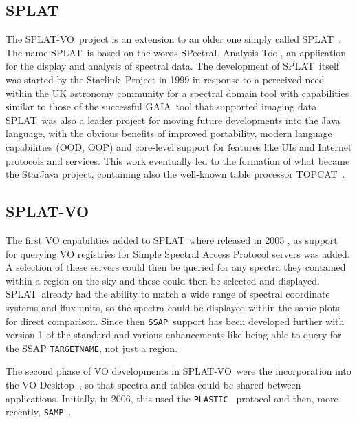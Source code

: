 \documentclass[final,authoryear,5p,times,twocolumn]{elsarticle}
\newcommand{\ssap}{\texttt{SSAP}}
\newcommand{\plastic}{\texttt{PLASTIC}}
\newcommand{\samp}{\texttt{SAMP}}
\newcommand{\splat}{\textsf{\small SPLAT}}
\newcommand{\splatvo}{{\textsf{\small{SPLAT-VO}}}}
\newcommand{\topcat}{\textsf{\small TOPCAT}}
\newcommand{\gaia}{\textsf{\small GAIA}}
\newcommand{\Starlink}{\textsf{\small Starlink}}
\newcommand{\vodesktop}{\textsf{\small VO-Desktop}}
\newcommand{\ascl}[1]{\href{http://www.ascl.net/#1}{ascl:#1}}
\begin{document}
\subsection{SPLAT}
%
The \splatvo\ project is an extension to an older one simply called
\splat\ \citep[][\ascl{1402.007}]{2002ASPC..281..513B}.  The name \splat\
is based on the words SPectraL Analysis Tool, an application for the
display and analysis of spectral data. The development of \splat\ itself
was started by the \Starlink\ Project \citep{1982QJRAS..23..485D} in
1999 in response to a perceived need within the UK astronomy community
for a spectral domain tool with capabilities similar to those of the
successful \gaia\ tool \citep[][\ascl{1403.024}]{2000ASPC..216..615D}
that supported imaging data. \splat\ was also a leader project for
moving future developments into the Java language, with the obvious
benefits of improved portability, modern language capabilities (OOD,
OOP) and core-level support for features like UIs and Internet
protocols and services. This work eventually led to the formation of
what became the StarJava project, containing also the well-known table processor \topcat\ \citep[][\ascl{1101.010}]{2005ASPC..347...29T}.

\subsection{SPLAT-VO}
%
The first VO capabilities added to \splat\ where released in 2005
\citep{2005ASPC..347...22D}, as support for querying VO registries for Simple
Spectral Access Protocol servers was added. A selection of these servers could
then be queried for any spectra they contained within a region on the sky and
these could then be selected and displayed. \splat\ already had the ability to
match a wide range of spectral coordinate systems and flux units, so the
spectra could be displayed within the same plots for direct comparison. Since
then \ssap\ support has been developed further with version 1 of the standard
and various enhancements like being able to query for the SSAP
\texttt{TARGETNAME}, not just a region.

The second phase of VO developments in \splatvo\ were the incorporation into
the \vodesktop\ \citep{2008ASPC..394..251W}, so that spectra and tables could
be shared between applications.  Initially, in 2006, this used the \plastic\
\citep{2007ASPC..376..511T} protocol and then, more recently, \samp\
\citep{2012ASPC..461..279T}.
\end{document}

